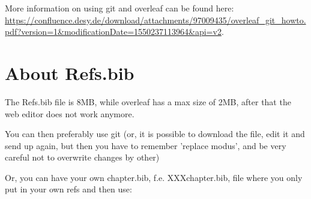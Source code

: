 More information on using git and overleaf can be found here: 
\url{https://confluence.desy.de/download/attachments/97009435/overleaf_git_howto.pdf?version=1&modificationDate=1550237113964&api=v2}.

\section{About Refs.bib}
The Refs.bib file is 8MB, while overleaf has a max size of 2MB,
after that the web editor does not work anymore.

You can then preferably use git (or, it is possible to download the file, edit it and send up again, but then you have to remember 'replace modus', and be very careful not to overwrite changes by other)

Or, you can have your own chapter.bib, f.e. XXXchapter.bib, file where you only put in your own refs and then use:

\begin{verbatim}

\end{verbatim}
